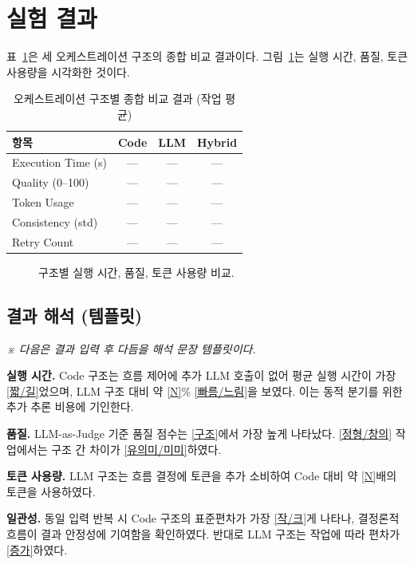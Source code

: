 \section{실험 결과}


표~\ref{tab:result}은 세 오케스트레이션 구조의 종합 비교 결과이다.
그림~\ref{fig:bar}는 실행 시간, 품질, 토큰 사용량을 시각화한 것이다.

\begin{table}[t]
\centering
\caption{오케스트레이션 구조별 종합 비교 결과 (작업 평균)}
\label{tab:result}
\begin{tabular}{lccc}
\toprule
\textbf{항목} & \textbf{Code} & \textbf{LLM} & \textbf{Hybrid} \\
\midrule
Execution Time (s) & --- & --- & --- \\
Quality (0--100)   & --- & --- & --- \\
Token Usage        & --- & --- & --- \\
Consistency (std)  & --- & --- & --- \\
Retry Count        & --- & --- & --- \\
\bottomrule
\end{tabular}
\end{table}

\begin{figure}[t]
\centering
\caption{구조별 실행 시간, 품질, 토큰 사용량 비교.}
\label{fig:bar}
\end{figure}

\subsection{결과 해석 (템플릿)}

\noindent\emph{※ 다음은 결과 입력 후 다듬을 해석 문장 템플릿이다.}

\textbf{실행 시간.} Code 구조는 흐름 제어에 추가 LLM 호출이 없어 평균
실행 시간이 가장 \underline{[짧/길]}었으며, LLM 구조 대비 약
\underline{[N]}\% \underline{[빠름/느림]}을 보였다. 이는 동적 분기를
위한 추가 추론 비용에 기인한다.

\textbf{품질.} LLM-as-Judge 기준 품질 점수는 \underline{[구조]}에서 가장
높게 나타났다. \underline{[정형/창의]} 작업에서는 구조 간 차이가
\underline{[유의미/미미]}하였다.

\textbf{토큰 사용량.} LLM 구조는 흐름 결정에 토큰을 추가 소비하여 Code
대비 약 \underline{[N]}배의 토큰을 사용하였다.

\textbf{일관성.} 동일 입력 반복 시 Code 구조의 표준편차가 가장
\underline{[작/크]}게 나타나, 결정론적 흐름이 결과 안정성에 기여함을
확인하였다. 반대로 LLM 구조는 작업에 따라 편차가 \underline{[증가]}하였다.
